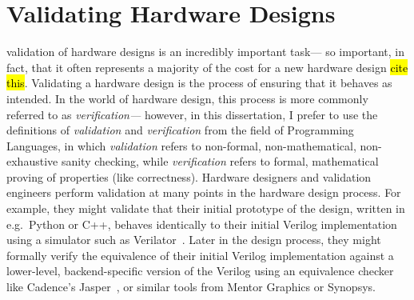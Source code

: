 
\section{Validating Hardware Designs}

\Gls{validation} of hardware designs
  is an incredibly important task---%
  so important, in fact, that it often represents
  a majority of the cost
  for a new hardware design \hl{cite this}.
Validating a hardware design
  is the process of ensuring
  that it behaves as intended.
In the world of hardware design,
  this process is more commonly
  referred to as
  \textit{verification---}%
  however, in this dissertation,
  I prefer to use the definitions
  of \textit{validation} and \textit{verification}
  from the field of Programming Languages,
  in which \textit{validation}
  refers to non-formal, non-mathematical,
  non-exhaustive sanity checking,
  while \textit{verification}
  refers to formal, mathematical
  proving of properties (like correctness).
Hardware designers and validation engineers
  perform validation
  at many points in the hardware design process.
For example,
  they might validate that
  their initial prototype of the design,
  written in e.g.~Python or C++,
  behaves identically to their
  initial Verilog implementation
  using a simulator
  such as Verilator~\cite{verilator}.
Later in the design process,
  they might
  formally verify the equivalence
  of their initial Verilog implementation
  against a lower-level,
  backend-specific version of the Verilog
  using an equivalence checker
  like Cadence's Jasper~\cite{jasper},
  or similar tools from Mentor Graphics
  or Synopsys.


